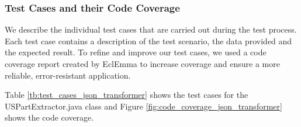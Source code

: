\subsubsection*{Test Cases and their Code Coverage}
We describe the individual test cases that are carried out during the test process. Each test case contains a description of the test scenario, the data provided and the expected result. To refine and improve our test cases, we used a code coverage report created by EclEmma to increase coverage and ensure a more reliable, error-resistant application.

Table \ref{tb:test_cases_json_transformer} shows the test cases for the USPartExtractor.java class and Figure \ref{fig:code_coverage_json_transformer} shows the code coverage.

\thispagestyle{empty}
\begingroup
\centering
\scriptsize
\renewcommand{\arraystretch}{1,5}
\keepXColumns
